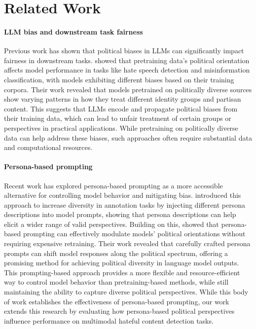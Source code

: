 \section{Related Work}
\paragraph{\textbf{LLM bias and downstream task fairness}}
Previous work has shown that political biases in LLMs can significantly impact fairness in downstream tasks. \citet{feng-etal-2023-pretraining} showed that pretraining data's political orientation affects model performance in tasks like hate speech detection and misinformation classification, with models exhibiting different biases based on their training corpora. Their work revealed that models pretrained on politically diverse sources show varying patterns in how they treat different identity groups and partisan content. This suggests that LLMs encode and propagate political biases from their training data, which can lead to unfair treatment of certain groups or perspectives in practical applications. 
While pretraining on politically diverse data can help address these biases, such approaches often require substantial data and computational resources.


\paragraph{\textbf{Persona-based prompting}}
Recent work has explored persona-based prompting as a more accessible alternative for controlling model behavior and mitigating bias. \citet{frohling2024personas} introduced this approach to increase diversity in annotation tasks by injecting different persona descriptions into model prompts, showing that persona descriptions can help elicit a wider range of valid perspectives. Building on this, \citet{bernardelle2024mappinginfluencingpoliticalideology} showed that persona-based prompting can effectively modulate models' political orientations without requiring expensive retraining. Their work revealed that carefully crafted persona prompts can shift model responses along the political spectrum, offering a promising method for achieving political diversity in language model outputs. This prompting-based approach provides a more flexible and resource-efficient way to control model behavior than pretraining-based methods, while still maintaining the ability to capture diverse political perspectives. While this body of work establishes the effectiveness of persona-based prompting, our work extends this research by evaluating how persona-based political perspectives influence performance on multimodal hateful content detection tasks.